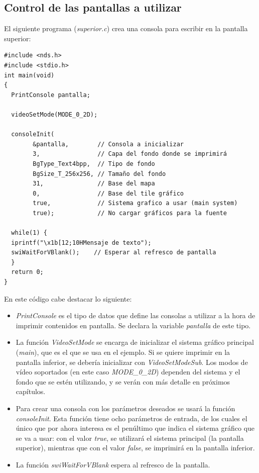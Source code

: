 \subsection{Control de las pantallas a utilizar}
\begin{example}
El siguiente programa (\textit{superior.c}) crea una consola para escribir en la pantalla superior:
\begin{lstlisting}
#include <nds.h>
#include <stdio.h>
int main(void)
{
  PrintConsole pantalla;

  videoSetMode(MODE_0_2D);

  consoleInit(
  		&pantalla,        // Consola a inicializar
	    3,                // Capa del fondo donde se imprimirá
	    BgType_Text4bpp,  // Tipo de fondo
	    BgSize_T_256x256, // Tamaño del fondo
	    31,               // Base del mapa
	    0,                // Base del tile gráfico
	    true,             // Sistema grafico a usar (main system)
	    true);            // No cargar gráficos para la fuente

  while(1) {
  iprintf("\x1b[12;10HMensaje de texto");
  swiWaitForVBlank();    // Esperar al refresco de pantalla
  }
  return 0;
}
\end{lstlisting}
\end{example}

En este código cabe destacar lo siguiente:
\begin{itemize}
\item \textit{PrintConsole} es el tipo de datos que define las consolas a utilizar a la hora de imprimir contenidos en pantalla. Se declara la variable \textit{pantalla} de este tipo.
%    
\item La función \textit{VideoSetMode} se encarga de inicializar el sistema gráfico principal (\textit{main}), que es el que se usa en el ejemplo. Si se quiere imprimir en la pantalla inferior, se debería inicializar con \textit{VideoSetModeSub}. Los modos de vídeo soportados (en este caso \textit{MODE\_0\_2D})  dependen del sistema y el fondo que se estén utilizando, y se verán con más detalle en próximos capítulos.
%
\item Para crear una consola con los parámetros deseados se usará la función \textit{consoleInit}. Esta función tiene ocho parámetros de entrada, de los cuales el único que por ahora interesa es el penúltimo que indica el sistema gráfico que se va a usar: con el valor \textit{true}, se utilizará el sistema principal (la pantalla superior), mientras que con el valor \textit{false}, se imprimirá en la pantalla inferior.  \item La función \textit{swiWaitForVBlank} espera al refresco de la pantalla.
\end{itemize}


